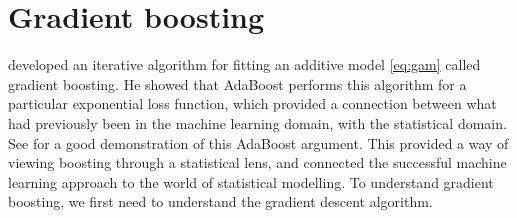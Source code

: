 \section{Gradient boosting}
\citet{friedman2001} developed an iterative algorithm for fitting an additive model \eqref{eq:gam} called gradient boosting. He showed that AdaBoost performs this algorithm for a particular exponential loss function, which provided a connection between what had previously been in the machine learning domain, with the statistical domain. See \citet{ESL} for a good demonstration of this AdaBoost argument. This provided a way of viewing boosting through a statistical lens, and connected the successful machine learning approach to the world of statistical modelling. To understand gradient boosting, we first need to understand the gradient descent algorithm.

